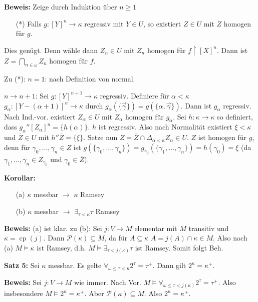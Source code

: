 \documentclass[a4paper,fontsize=11pt]{scrartcl}
\newcommand{\cp}{\operatorname{cp}}
\renewcommand{\bar}[1]{\overline{#1}}
\begin{document}
	{\bf Beweis:} Zeige durch Induktion über $n\ge 1$ \begin{itemize}
			\item[(*)] Falls $g\colon[Y]^n\to\kappa$ regressiv mit $Y\in U$, so existiert $Z\in U$ mit $Z$ homogen für $g$.
		\end{itemize}
		Dies genügt.
		Denn wähle dann $Z_n\in U$ mit $Z_n$ homogen für $f\upharpoonright[X]^n$. 
		Dann ist $Z=\bigcap_{n\in\omega} Z_n$ homogen für $f$.

		Zu (*): $n=1$: nach Definition von normal. 

		$n\to n+1$: Sei $g\colon[Y]^{n+1}\to\kappa$ regressiv.
		Definiere für $\alpha<\kappa$ $g_{\alpha}\colon[Y-(\alpha+1)]^n\to\kappa$ durch $g_{\alpha}(\{\vec\gamma\})=g(\{\alpha,\vec\gamma\})$.
		Dann ist $g_{\alpha}$ regressiv.
		Nach Ind.-vor. existiert $Z_{\alpha}\in U$ mit $Z_{\alpha}$ homogen für $g_{\alpha}$.
		Sei $h\colon\kappa\to\kappa$ so definiert, dass $g_{\alpha}''[Z_{\alpha}]^n=\{h(\alpha)\}$.
		$h$ ist regressiv.
		Also nach Normalität existiert $\xi<\kappa$ und $\bar Z\in U$ mit $h''\bar Z=\{\xi\}$.
		Setze nun $Z=\bar Z\cap \Delta_{\alpha<\kappa}Z_{\alpha} \in U$. %
		$Z$ ist homogen für $g$, denn für $\gamma_0,\ldots,\gamma_n\in Z$ ist 
		$g(\{\gamma_0,\ldots,\gamma_n\})=g_{\gamma_0}(\{\gamma_1,\ldots,\gamma_n\})= h(\gamma_0) = \xi $ 
		(da $\gamma_1,\ldots,\gamma_n\in Z_{\gamma_0}$ und $\gamma_0 \in \bar Z$).

{\bf Korollar:} \begin{itemize}
		\item[(a)] $\kappa$ messbar $\to$ $\kappa$ Ramsey
		\item[(b)] $\kappa$ messbar $\to$ $\exists_{\tau<\kappa} \tau$ Ramsey
	\end{itemize}

	{\bf Beweis:} (a) ist klar. 
		zu (b): Sei $j\colon V\to M$ elementar mit $M$ transitiv und $\kappa=\cp(j)$.
		Dann $\mathcal P(\kappa)\subseteq M$, da für $A\subseteq\kappa$ $A=j(A)\cap\kappa\in M$.
		Also nach (a) $M\models \kappa$ ist Ramsey, d.h. $M\models \exists_{\tau<j(\kappa)} \tau$ ist Ramsey.
		Somit folgt Beh.

{\bf Satz 5:} Sei $\kappa$ messbar.
	Es gelte $\forall_{\omega\le\tau<\kappa} 2^{\tau}=\tau^+$.
	Dann gilt $2^{\kappa}=\kappa^+$.

	{\bf Beweis:} Sei $j\colon V\to M$ wie immer.
		Nach Vor. $M\models \forall_{\omega\le\tau<j(\kappa)} 2^{\tau}=\tau^+$.
		Also insbesondere $M\models 2^{\kappa}=\kappa^+$.
		Aber $\mathcal P(\kappa)\subseteq M$.
		Also $2^{\kappa}=\kappa^+$.
\end{document}

